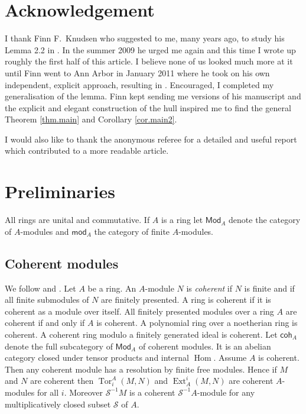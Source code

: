 \documentclass[a4paper,10pt]{amsart}
\theoremstyle{plain}
\theoremstyle{definition}
\theoremstyle{remark}
\numberwithin{equation}{xx}
\DeclareMathOperator{\Ext}{Ext}
\DeclareMathOperator{\Hom}{Hom}
\DeclareMathOperator{\Tor}{Tor}
\newcommand{\cat}[1]{\mathsf{{#1}}}
\newcommand{\mc}[1]{\mathcal{#1}}
\newcommand{\tor}[4]{{\Tor}_{#2}^{#1}({#3},{#4})}
\newcommand{\xt}[4]{{\Ext} _{#2}^{#1}({#3},{#4})}
\begin{document}
\section*{Acknowledgement}
I thank Finn F.\ Knudsen who suggested to me, many years ago, to study his Lemma 2.2 in \cite{knu:83a}. In the summer 2009 he urged me again and this time I wrote up roughly the first half of this article. I believe none of us looked much more at it until Finn went to Ann Arbor in January 2011 where he took on his own independent, explicit approach, resulting in \cite{knu:12}. Encouraged, I completed my generalisation of the lemma. Finn kept sending me versions of his manuscript and the explicit and elegant construction of the hull inspired me to find the general Theorem \ref{thm.main} and Corollary \ref{cor.main2}.

I would also like to thank the anonymous referee for a detailed and useful report which contributed to a more readable article.
\section{Preliminaries}
All rings are unital and commutative. If \(A\) is a ring let \(\cat{Mod}_{A}\) denote the category of \(A\)-modules and \(\cat{mod}_{A}\) the category of finite \(A\)-modules.
\subsection{Coherent modules}
We follow \cite[Chap.\ 1, \S2, Exc.\ 11-12]{bou:98} and \cite[Chap.\ 2]{gla:89}.
Let \(A\) be a ring. An \(A\)-module \(N\) is \emph{coherent} if \(N\) is finite and if all finite submodules of \(N\) are finitely presented. A ring is coherent if it is coherent as a module over itself. 
All finitely presented modules over a ring \(A\) are coherent if and only if \(A\) is coherent. A polynomial ring over a noetherian ring is coherent. A coherent ring modulo a finitely generated ideal is coherent.
Let \(\cat{coh}_{A}\) denote the full subcategory of \(\cat{Mod}_{A}\) of coherent modules. It is an abelian category closed under tensor products and internal \(\Hom\). 
Assume \(A\) is coherent. Then any coherent module has a resolution by finite free modules. Hence if \(M\) and \(N\) are coherent then \(\tor{A}{i}{M}{N}\) and \(\xt{i}{A}{M}{N}\) are coherent \(A\)-modules for all \(i\). Moreover \(\mc{S}^{-1}M\) is a coherent \(\mc{S}^{-1}A\)-module for any multiplicatively closed subset \(\mc{S}\) of \(A\).
\end{document}
